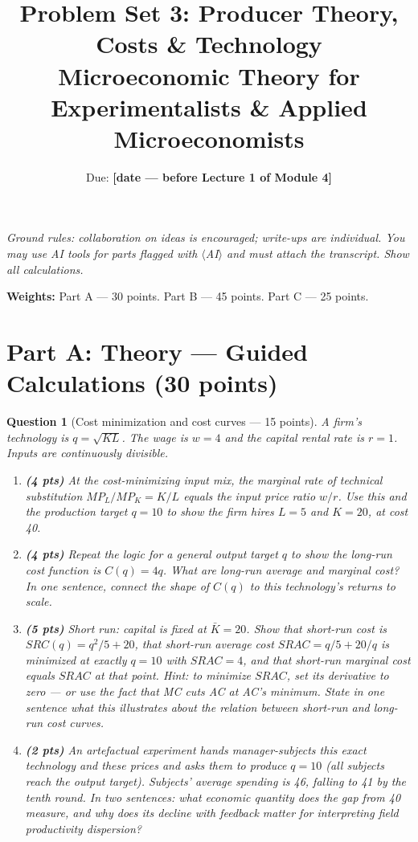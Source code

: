 \documentclass[11pt]{article}
\title{Problem Set 3: Producer Theory, Costs \& Technology\\
\large Microeconomic Theory for Experimentalists \& Applied Microeconomists}
\author{Due: \textbf{[date --- before Lecture 1 of Module 4]}}
\date{}
\newtheorem{question}{Question}
\begin{document}
\maketitle

\noindent\emph{Ground rules: collaboration on ideas is encouraged; write-ups
are individual. You may use AI tools for parts flagged with
$\langle$AI$\rangle$ and must attach the transcript. Show all calculations.}

\medskip

\noindent\textbf{Weights:} Part A --- 30 points. Part B --- 45 points.
Part C --- 25 points.

\bigskip

\section*{Part A: Theory --- Guided Calculations (30 points)}

\begin{question}[Cost minimization and cost curves --- 15 points]
A firm's technology is $q = \sqrt{KL}$. The wage is $w = 4$ and the
capital rental rate is $r = 1$. Inputs are continuously divisible.

\begin{enumerate}[label=(\alph*)]
  \item \textbf{(4 pts)} At the cost-minimizing input mix, the marginal
        rate of technical substitution $MP_L / MP_K = K/L$ equals the
        input price ratio $w/r$. Use this and the production target
        $q = 10$ to show the firm hires $L = 5$ and $K = 20$, at cost 40.
  \item \textbf{(4 pts)} Repeat the logic for a general output target $q$
        to show the long-run cost function is $C(q) = 4q$. What are
        long-run average and marginal cost? In one sentence, connect the
        shape of $C(q)$ to this technology's returns to scale.
  \item \textbf{(5 pts)} Short run: capital is fixed at $\bar K = 20$.
        Show that short-run cost is $SRC(q) = q^2/5 + 20$, that short-run
        average cost $SRAC = q/5 + 20/q$ is minimized at exactly $q = 10$
        with $SRAC = 4$, and that short-run marginal cost equals $SRAC$
        at that point. \emph{Hint: to minimize $SRAC$, set its derivative
        to zero --- or use the fact that MC cuts AC at AC's minimum.}
        State in one sentence what this illustrates about the relation
        between short-run and long-run cost curves.
  \item \textbf{(2 pts)} An artefactual experiment hands manager-subjects
        this exact technology and these prices and asks them to produce
        $q = 10$ (all subjects reach the output target). Subjects' average
        spending is 46, falling to 41 by the tenth round. In two sentences: what economic quantity does the
        gap from 40 measure, and why does its decline with feedback
        matter for interpreting field productivity dispersion?
\end{enumerate}
\end{question}
\end{document}
